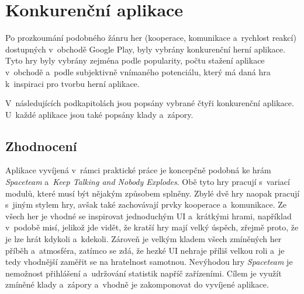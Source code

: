 \chapter{Konkurenční aplikace}
\label{chap:competitive-apps}

Po prozkoumání podobného žánru her
(kooperace, komunikace a~rychlost reakcí)
dostupných v~obchodě Google Play,
byly vybrány konkurenční herní aplikace.
Tyto hry byly vybrány zejména podle popularity,
počtu stažení aplikace v~obchodě
a~podle subjektivně vnímaného potenciálu,
který má daná hra k~inspiraci pro tvorbu herní aplikace.

V~následujících podkapitolách jsou popsány vybrané čtyři konkurenční aplikace.
U~každé aplikace jsou také popsány klady a~zápory.




\pagebreak


\section{Zhodnocení}

Aplikace vyvíjená v~rámci praktické práce je koncepčně podobná ke hrám
\emph{Spaceteam} a~\emph{Keep Talking and Nobody Explodes}.
Obě tyto hry pracují s~variací modulů,
které musí být nějakým způsobem splněny.
Zbylé dvě hry naopak pracují s~jiným stylem hry,
avšak také zachovávají prvky kooperace a~komunikace.
Ze všech her je vhodné se inspirovat jednoduchým UI a~krátkými hrami,
například v~podobě misí,
jelikož jde vidět,
že kratší hry mají velký úspěch,
zřejmě proto,
že je lze hrát kdykoli a~kdekoli.
Zároveň je velkým kladem všech zmíněných her příběh a~atmosféra,
zatímco se zdá,
že hezké UI nehraje příliš velkou roli
a~je tedy vhodnější zaměřit se na hratelnost samotnou.
Nevýhodou hry \emph{Spaceteam} je nemožnost přihlášení a~udržování statistik
napříč zařízeními.
Cílem je využít zmíněné klady a~zápory a~vhodně je zakomponovat do vyvíjené
aplikace.
